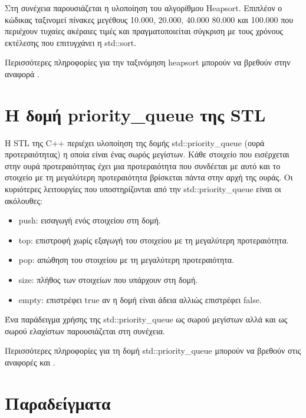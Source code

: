 Στη συνέχεια παρουσιάζεται η υλοποίηση του αλγορίθμου Heapsort. Επιπλέον ο κώδικας ταξινομεί πίνακες μεγέθους 10.000, 20.000, 40.000 80.000 και 100.000 που περιέχουν τυχαίες ακέραιες τιμές και πραγματοποιείται σύγκριση με τους χρόνους εκτέλεσης που επιτυγχάνει η std::sort.





Περισσότερες πληροφορίες για την ταξινόμηση heapsort μπορούν να βρεθούν στην αναφορά \cite{programiz_heapsort}.


\section{Η δομή priority\_queue της STL}
Η STL της C++ περιέχει υλοποίηση της δομής std::priority\_queue (ουρά προτεραιότητας) η οποία είναι ένας σωρός μεγίστων. Κάθε στοιχείο που εισέρχεται  στην ουρά προτεραιότητας έχει μια προτεραιότητα που συνδέεται με αυτό και το στοιχείο με τη μεγαλύτερη προτεραιότητα βρίσκεται πάντα στην αρχή της ουράς. Οι κυριότερες λειτουργίες που υποστηρίζονται από την std::priority\_queue είναι οι ακόλουθες:
\begin{itemize}[noitemsep]
\item push: εισαγωγή ενός στοιχείου στη δομή.
\item top: επιστροφή χωρίς εξαγωγή του στοιχείου με τη μεγαλύτερη προτεραιότητα.
\item pop: απώθηση του στοιχείου με τη μεγαλύτερη προτεραιότητα.
\item size: πλήθος των στοιχείων που υπάρχουν στη δομή.
\item empty: επιστρέφει true αν η δομή είναι άδεια αλλιώς επιστρέφει false.
\end{itemize}
Ένα παράδειγμα χρήσης της std::priority\_queue ως σωρού μεγίστων αλλά και ως σωρού ελαχίστων παρουσιάζεται στη συνέχεια.





Περισσότερες πληροφορίες για τη δομή std::priority\_queue μπορούν να βρεθούν στις αναφορές \cite{g4g_priority_queue} και \cite{cppref_priority_queue}.


\section{Παραδείγματα}
